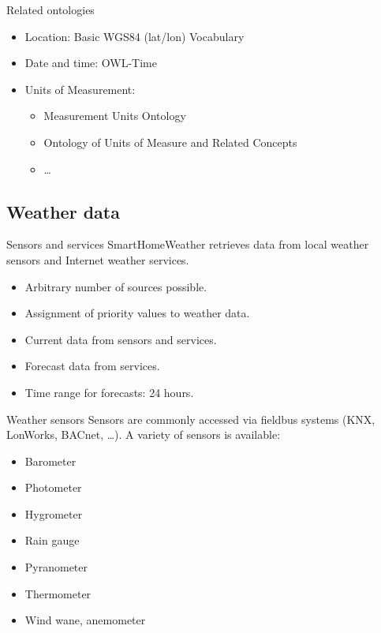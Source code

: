 \documentclass{beamer}
\begin{document}
\begin{frame}{Related ontologies}
	\begin{itemize}
		\item Location: Basic WGS84 (lat/lon) Vocabulary
		\item Date and time: OWL-Time
		\item Units of Measurement:
			\begin{itemize}
				\item Measurement Units Ontology
				\item Ontology of Units of Measure and Related Concepts
				\item …
			\end{itemize}
	\end{itemize}
\end{frame}

\subsection{Weather data}

\begin{frame}{Sensors and services}
	SmartHomeWeather retrieves data from local weather sensors and Internet weather services.

	\begin{itemize}
		\item Arbitrary number of sources possible.
		\item Assignment of priority values to weather data.
		\item Current data from sensors and services.
		\item Forecast data from services.
		\item Time range for forecasts: 24 hours.
	\end{itemize}
\end{frame}

\begin{frame}{Weather sensors}
	Sensors are commonly accessed via fieldbus systems (KNX, LonWorks, BACnet, …).
	A variety of sensors is available:
	\begin{itemize}
		\item Barometer
		\item Photometer
		\item Hygrometer
		\item Rain gauge
		\item Pyranometer
		\item Thermometer
		\item Wind wane, anemometer
	\end{itemize}
\end{frame}
\end{document}

